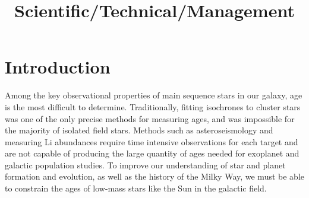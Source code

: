 \documentclass[12pt]{article}
\begin{document}


\title{\vspace{-0.5in}Scientific/Technical/Management}
\date{}

\maketitle


\vspace{-1in}

\section{Introduction}






Among the key observational properties of main sequence stars in our galaxy, age is the most difficult to determine. Traditionally, fitting isochrones to cluster stars was one of the only precise methods for measuring ages, and was impossible for the majority of isolated field stars. Methods such as asteroseismology and measuring Li abundances require time intensive observations for each target and are not capable of producing the large quantity of ages needed for exoplanet and galactic population studies. To improve our understanding of star and planet formation and evolution, as well as the history of the Milky Way, we must be able to constrain the ages of low-mass stars like the Sun in the galactic field.
\end{document}
